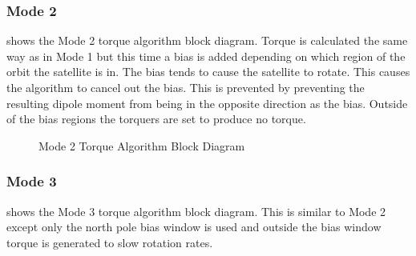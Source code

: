\subsubsection{Mode 2}

 shows the Mode 2 torque algorithm block diagram. Torque is calculated the same way as in Mode 1 but this time a bias is added depending on which region of the orbit the satellite is in. The bias tends to cause the satellite to rotate. This causes the algorithm to cancel out the bias. This is prevented by preventing the resulting dipole moment from being in the opposite direction as the bias. Outside of the bias regions the torquers are set to produce no torque.

\begin{figure}[H]
    \centering
    \caption{Mode 2 Torque Algorithm Block Diagram}
    \label{fig:mode2}
\end{figure}

\subsubsection{Mode 3}

 shows the Mode 3 torque algorithm block diagram. This is similar to Mode 2 except only the north pole bias window is used and outside the bias window torque is generated to slow rotation rates.

